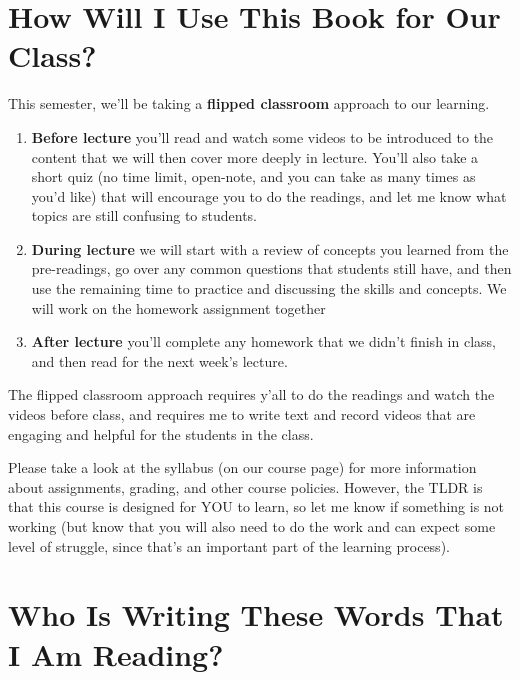 \documentclass[
  letterpaper,
  DIV=11,
  numbers=noendperiod,
  oneside]{scrreprt}
\begin{document}
\section*{How Will I Use This Book for Our
Class?}\label{how-will-i-use-this-book-for-our-class}


This semester, we'll be taking a \textbf{flipped classroom} approach to
our learning.

\begin{enumerate}
\def\labelenumi{\arabic{enumi}.}
\item
  \textbf{Before lecture} you'll read and watch some videos to be
  introduced to the content that we will then cover more deeply in
  lecture. You'll also take a short quiz (no time limit, open-note, and
  you can take as many times as you'd like) that will encourage you to
  do the readings, and let me know what topics are still confusing to
  students.
\item
  \textbf{During lecture} we will start with a review of concepts you
  learned from the pre-readings, go over any common questions that
  students still have, and then use the remaining time to practice and
  discussing the skills and concepts. We will work on the homework
  assignment together
\item
  \textbf{After lecture} you'll complete any homework that we didn't
  finish in class, and then read for the next week's lecture.
\end{enumerate}

The flipped classroom approach requires y'all to do the readings and
watch the videos before class, and requires me to write text and record
videos that are engaging and helpful for the students in the class.

Please take a look at the syllabus (on our course page) for more
information about assignments, grading, and other course policies.
However, the TLDR is that this course is designed for YOU to learn, so
let me know if something is not working (but know that you will also
need to do the work and can expect some level of struggle, since that's
an important part of the learning process).

\section*{Who Is Writing These Words That I Am
Reading?}\label{who-is-writing-these-words-that-i-am-reading}
\end{document}
